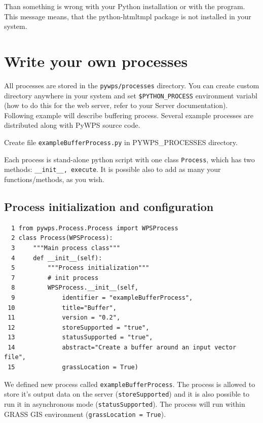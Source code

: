 \documentclass[a4paper,11pt]{article}
\begin{document}
     
Than something is wrong with your Python installation or with the program.
This message means, that the python-htmltmpl package is not installed in
your system.
     
\section{Write your own processes}
\label{processes}
    
All processes are stored in the \texttt{pywps/processes} directory. You can
create custom directory anywhere in your system and set
\texttt{\$PYTHON\_PROCESS} environment variabl (how to do this for the web
server, refer to your Server documentation). Following example will
describe buffering process.  Several example processes are distributed along with PyWPS source code.

Create file \texttt{exampleBufferProcess.py} in PYWPS\_PROCESSES directory.
    
Each process is stand-alone python script with one class \texttt{Process},
which has two methods: \texttt{\_\_init\_\_, execute}. It is possible also to add as 
many your functions/methods, as you wish.
    
\subsection{Process initialization and configuration}

\begin{verbatim}
  1 from pywps.Process.Process import WPSProcess                                
  2 class Process(WPSProcess):
  3     """Main process class"""
  4     def __init__(self):
  5         """Process initialization"""
  7         # init process
  8         WPSProcess.__init__(self,
  9             identifier = "exampleBufferProcess",
 10             title="Buffer",
 11             version = "0.2",
 12             storeSupported = "true",
 13             statusSupported = "true",
 14             abstract="Create a buffer around an input vector file",
 15             grassLocation = True)
\end{verbatim}

We defined new process called \texttt{exampleBufferProcess}. The process is allowed to
store it's output data on the server (\texttt{storeSupported}) and it is also possible to run it in
asynchronous mode (\texttt{statusSupported}). The process will run within
GRASS GIS environment (\texttt{grassLocation = True}).
     
\end{document}
